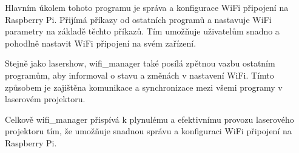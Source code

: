 
Hlavním úkolem tohoto programu je správa a konfigurace WiFi připojení na Raspberry Pi. Přijímá příkazy od ostatních programů a nastavuje WiFi parametry na základě těchto příkazů. Tím umožňuje uživatelům snadno a pohodlně nastavit WiFi připojení na svém zařízení.

Stejně jako lasershow, wifi\_manager také posílá zpětnou vazbu ostatním programům, aby informoval o stavu a změnách v nastavení WiFi. Tímto způsobem je zajištěna komunikace a synchronizace mezi všemi programy v laserovém projektoru.

Celkově wifi\_manager přispívá k plynulému a efektivnímu provozu laserového projektoru tím, že umožňuje snadnou správu a konfiguraci WiFi připojení na Raspberry Pi.